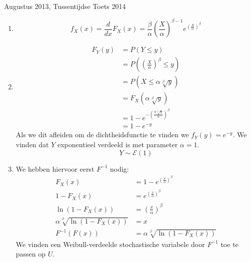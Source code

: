 \documentclass[main.tex]{subfiles}
\begin{document}
\begin{examenvraag}{Augustus 2013, Tussentijdse Toets 2014}
  \begin{ex-antwoord}
    \begin{enumerate}
    \item {}
      \[ f_{X}(x) = \frac{d}{dx}F_{X}(x) = \frac{\beta}{\alpha}\left(\frac{X}{\alpha}\right)^{\beta-1}e^{\left(\frac{X}{\alpha}\right)^{\beta}} \]
    \item {} 
      \begin{align*}
        F_{Y}(y)
        &= P(Y \le y)\\
        &= P\left(\left(\frac{X}{\alpha}\right)^{\beta} \le y\right)\\
        &= P\left( X \le \alpha\sqrt[\beta]{y} \right)\\
        &= F_{X}\left(\alpha\sqrt[\beta]{y} \right)\\
        &= 1 - e^{-\left(\frac{\alpha\sqrt[\beta]{y}}{\alpha}\right)^{\beta}}\\
        &= 1-e^{-y}
      \end{align*}
      Als we dit afleiden om de dichtheidsfunctie te vinden we $f_{Y}(y) = e^{-y}$.
      We vinden dat $Y$ exponentieel verdeeld is met parameter $\alpha = 1$.
      \[ Y \sim \mathcal{E}(1) \]
    \item
      We hebben hiervoor eerst $F^{-1}$ nodig:
      \begin{align*}
        F_{X}(x) &=  1 - e^{\left(\frac{x}{\alpha}\right)^{\beta}}\\
        1-F_{X}(x) &= e^{\left(\frac{x}{\alpha}\right)^{\beta}}\\
        \ln\left(1-F_{X}(x)\right) &= \left(\frac{x}{\alpha}\right)^{\beta}\\
        \alpha \sqrt[\beta]{\ln\left(1-F_{X}(x)\right)} &= x\\
        F^{-1}(F(x)) &= \alpha \sqrt[\beta]{\ln\left(1-F_{X}(x)\right)}                                                
      \end{align*}
      We vinden een Weibull-verdeelde stochastische variabele door $F^{-1}$ toe te passen op $U$.
    \end{enumerate}
  \end{ex-antwoord}
\end{examenvraag}
\end{document}
